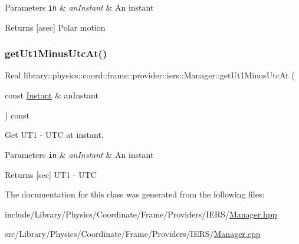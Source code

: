 \begin{DoxyParams}[1]{Parameters}
\mbox{\tt in}  & {\em an\+Instant} & An instant \\
\hline
\end{DoxyParams}
\begin{DoxyReturn}{Returns}
\mbox{[}asec\mbox{]} Polar motion 
\end{DoxyReturn}
\mbox{\label{classlibrary_1_1physics_1_1coord_1_1frame_1_1provider_1_1iers_1_1_manager_a67749dc760378bc56c82cc752833e4d9}} 
\subsubsection{\texorpdfstring{get\+Ut1\+Minus\+Utc\+At()}{getUt1MinusUtcAt()}}
{\footnotesize\ttfamily Real library\+::physics\+::coord\+::frame\+::provider\+::iers\+::\+Manager\+::get\+Ut1\+Minus\+Utc\+At (\begin{DoxyParamCaption}\item[{const \hyperlink{classlibrary_1_1physics_1_1time_1_1_instant}{Instant} \&}]{an\+Instant }\end{DoxyParamCaption}) const}



Get U\+T1 -\/ U\+TC at instant. 


\begin{DoxyParams}[1]{Parameters}
\mbox{\tt in}  & {\em an\+Instant} & An instant \\
\hline
\end{DoxyParams}
\begin{DoxyReturn}{Returns}
\mbox{[}sec\mbox{]} U\+T1 -\/ U\+TC 
\end{DoxyReturn}


The documentation for this class was generated from the following files\+:\begin{DoxyCompactItemize}
\item 
include/\+Library/\+Physics/\+Coordinate/\+Frame/\+Providers/\+I\+E\+R\+S/\hyperlink{_providers_2_i_e_r_s_2_manager_8hpp}{Manager.\+hpp}\item 
src/\+Library/\+Physics/\+Coordinate/\+Frame/\+Providers/\+I\+E\+R\+S/\hyperlink{_providers_2_i_e_r_s_2_manager_8cpp}{Manager.\+cpp}\end{DoxyCompactItemize}
